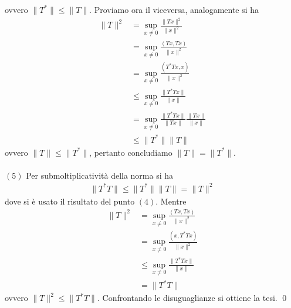 \documentclass{article}
\numberwithin{equation}{subsection}
\begin{document}
ovvero $\|T^*\| \leq \|T\|$. Proviamo ora il viceversa, analogamente si ha
\begin{align*}
    \|T\|^2 &= \sup_{x \neq 0}\frac{\|Tx\|^2}{\|x\|^2}  \\
    &= \sup_{x \neq 0}\frac{(Tx, Tx)}{\|x\|^2}  \\
    &= \sup_{x \neq 0}\frac{(T^*Tx, x)}{\|x\|^2}  \\
    &\leq \sup_{x \neq 0}\frac{\|T^*Tx\|}{\|x\|}  \\
    &= \sup_{x \neq 0}\frac{\|T^*Tx\|}{\|Tx\|}\frac{\|Tx\|}{\|x\|}  \\
    &\leq \|T^*\|\|T\| 
\end{align*}
ovvero $\|T\| \leq \|T^*\|$, pertanto concludiamo $\|T\| = \|T^*\|$. \\ \\
$(5)$ Per submoltiplicatività della norma si ha 
\begin{align*}
    \|T^*T\| \leq \|T^*\|\|T\| = \|T\|^2 
\end{align*}
dove si è usato il risultato del punto $(4)$. Mentre
\begin{align*}
    \|T\|^2 &= \sup_{x \neq 0} \frac{(Tx, Tx)}{\|x\|^2} \\
    &= \sup_{x \neq 0} \frac{(x, T^*Tx)}{\|x\|^2} \\
    &\leq \sup_{x \neq 0} \frac{\|T^*Tx\|}{\|x\|} \\
    &= \|T^*T\|
\end{align*}
ovvero $\|T\|^2 \leq \|T^*T\|$. Confrontando le disuguaglianze si ottiene la tesi. \qed

\newpage
\end{document}
